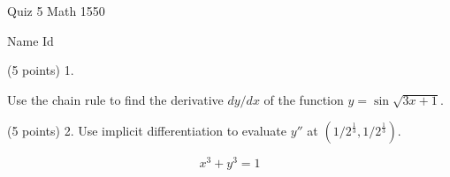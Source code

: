 \documentclass{article}
\begin{document}
\begin{large}
\begin{bf}
\hspace{1.5in}
\parbox{1in}{Quiz 5 \newline Math 1550}
\hspace{1in}
\parbox{1in}{ Name \newline Id}
\end{bf}
\end{large}

 \vspace{0.3in}
   
  

(5 points) 1. \parbox[t]{4in}{ Use the chain rule to find the  derivative
 $dy/dx$ of the function $y=\sin \sqrt{3x+1}$. 
}

\vspace{3.0in}  
(5 points) 2. Use implicit differentiation to evaluate $y''$ at 
$(1/2^{\frac{1}{3}}, 1/2^{\frac{1}{3}})$. 

$$x^3+y^3=1$$
\end{document}
